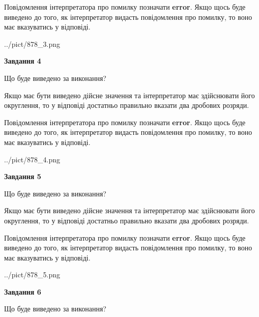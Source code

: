 \documentclass[12pt, ukrainian]{article}
\begin{document}
{\begin {Large}
Повідомлення інтерпретатора про помилку позначати \textbf{error}.
Якщо щось буде виведено до того, як інтерпретатор видасть повідомлення про помилку, 
то воно має вказуватись у відповіді. \par

\begin{center}
	{../pict/878_3.png}
\end{center}
\newpage

{\begin {center}\textbf{Завдання 4}\end {center}}\par
Що буде виведено за виконання? \par

Якщо має бути виведено дійсне значення та інтерпретатор має здійснювати його округлення, 
то у відповіді достатньо правильно вказати два дробових розряди.

Повідомлення інтерпретатора про помилку позначати \textbf{error}.
Якщо щось буде виведено до того, як інтерпретатор видасть повідомлення про помилку, 
то воно має вказуватись у відповіді. \par

\begin{center}
	{../pict/878_4.png}
\end{center}
\newpage

{\begin {center}\textbf{Завдання 5}\end {center}}\par
Що буде виведено за виконання? \par

Якщо має бути виведено дійсне значення та інтерпретатор має здійснювати його округлення, 
то у відповіді достатньо правильно вказати два дробових розряди.

Повідомлення інтерпретатора про помилку позначати \textbf{error}.
Якщо щось буде виведено до того, як інтерпретатор видасть повідомлення про помилку, 
то воно має вказуватись у відповіді. \par

\begin{center}
	{../pict/878_5.png}
\end{center}
\newpage

{\begin {center}\textbf{Завдання 6}\end {center}}\par
Що буде виведено за виконання? \par


\end{Large}}
\end{document}

